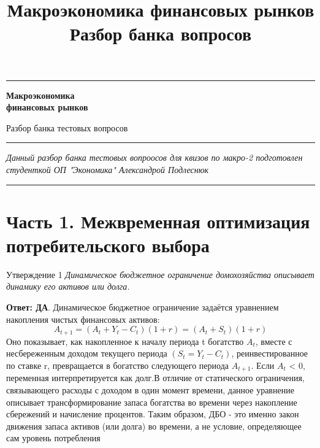 \documentclass[10pt,a4paper]{article}
\title{\color{sectionblue}\Large\textbf{Макроэкономика финансовых рынков}\\[4pt]
\large Разбор банка вопросов}
\date{}
\newcommand{\qda}{\textbf{\color{yesgreen}Ответ: ДА}}
\newenvironment{answer}[2]{%
  \begin{qbox}{Утверждение #1}
  \textit{#2}\par\smallskip
}{%
  \end{qbox}\vspace{2pt}
}
\begin{document}
\begin{titlepage}
    \thispagestyle{empty}
    \centering

    \textcolor{mainblue}{\rule{\textwidth}{1.2pt}}

    \vspace{1.2cm}

    {\color{mainblue}\Huge\bfseries Макроэкономика\\[4pt] финансовых рынков\par}

    \vspace{0.8cm}

    {\color{mainblue}\Large Разбор банка тестовых вопросов \\[2pt]\par}

    \vspace{0.6cm}

    \textcolor{mainblue}{\rule{\textwidth}{0.4pt}}

    \vfill

    \begin{minipage}{0.85\textwidth}
        \small\itshape
        Данный разбор банка тестовых вопроосов для квизов по макро-2 подготовлен студенткой ОП "Экономика" Александрой Подлеснюк
    \end{minipage}

    \vspace{1cm}

    \textcolor{mainblue}{\rule{\textwidth}{1.2pt}}
\end{titlepage}

\newpage
\tableofcontents
\newpage

\section{Часть 1. Межвременная оптимизация потребительского выбора}

\begin{answer}{1}{Динамическое бюджетное ограничение домохозяйства описывает динамику его активов или долга.}
\qda. Динамическое бюджетное ограничение задаётся уравнением накопления чистых финансовых активов:
\[
A_{t+1} = (A_t + Y_t - C_t)(1+r) = (A_t + S_t)(1+r)
\]
Оно показывает, как накопленное к началу периода t богатство $A_t$, вместе с несбереженным доходом текущего периода $(S_t = Y_t − C_t)$, реинвестированное по ставке r, превращается в богатство следующего периода $A_{t+1}$. Если $A_t$ < 0, переменная интерпретируется как долг.В отличие от статического ограничения, связывающего расходы с доходом в один момент времени, данное уравнение описывает трансформирование запаса богатства во времени через накопление сбережений и начисление процентов. Таким образом, ДБО - это именно закон движения запаса активов (или долга) во времени, а не условие, определяющее сам уровень потребления
\end{answer}
\end{document}
